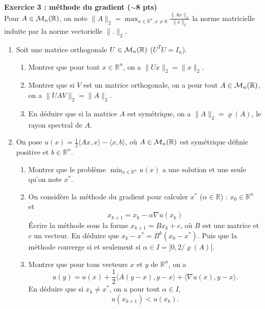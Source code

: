 \documentclass[11pt,a4paper]{article}
\begin{document}
\newpage

{\bf Exercice 3 : m\'ethode du gradient ($\sim$8 pts)} \vspace{0.1cm}\\

Pour $A\in{\cal M}_n({\mathbb R})$, on note $\displaystyle\|A\|_2=
\max_{x\in{\mathbb R}^n,x\neq 0}\frac{\|Ax\|_2}{\|x\|_2}$ la norme matricielle induite 
par la norme vectorielle $\|.\|_2$. 
 
\begin{enumerate}
\item Soit une matrice orthogonale $U\in{\cal M}_n({\mathbb R})$ ($U^TU=I_n$). 
\begin{enumerate}
 \item 
Montrer que pour tout  $x\in{\mathbb R}^n$, on a
$\|Ux\|_2=\|x\|_2$.
\item Montrer que si $V$ est un matrice orthogonale, on a pour tout $A\in {\cal M}_n({\mathbb R})$, on a $\|UAV\|_2=\|A\|_2$.
\item 
En d\'eduire que si la matrice $A$ est sym\'etrique, on a $\|A\|_2=\varrho(A)$, le rayon spectral de $A$. 
\end{enumerate}
\item 
On pose $u(x)=
\frac{1}{2} \langle A x,x \rangle - \langle x,b \rangle$,
o\`u $A\in{\cal M}_n({\mathbb R})$ est sym\'etrique d\'efinie positive et $b\in{\mathbb R}^n$. 

\begin{enumerate}
\item Montrer que le probl\`eme $\min_{x\in{\mathbb R}^n} u(x)$ a une solution et une seule qu'on note  $x^\ast$. 
\item On consid\`ere la m\'ethode du gradient pour calculer $x^\ast$ ($\alpha\in{\mathbb R}$) : $x_0\in{\mathbb R}^n$ et 
\begin{equation*} 
x_{k+1}=x_k -\alpha\nabla u (x_k)
\end{equation*}
\'Ecrire la m\'ethode sous la forme $x_{k+1}=Bx_k +c$, o\`u $B$ est une matrice et $c$ un vecteur. En d\'eduire que  $x_{k}-x^\ast=B^k(x_0 -x^\ast)$. Puis que la m\'ethode converge si et seulement si $\alpha \in I=]0, 2/\varrho(A)[$.
 \item Montrer que pour tous vecteurs $x$ et $y$ de ${\mathbb R}^n$, on a 
\[u(y) = u(x) + \frac{1}{2} 
\langle A (y-x),y-x \rangle +  \langle \nabla u(x), y-x \rangle.\] 
En d\'eduire que si $x_k\neq x^\ast$, on a pour tout $\alpha \in I$,   
\[u(x_{k+1}) < u(x_k).\]

\end{enumerate}
\end{enumerate}
\end{document}
